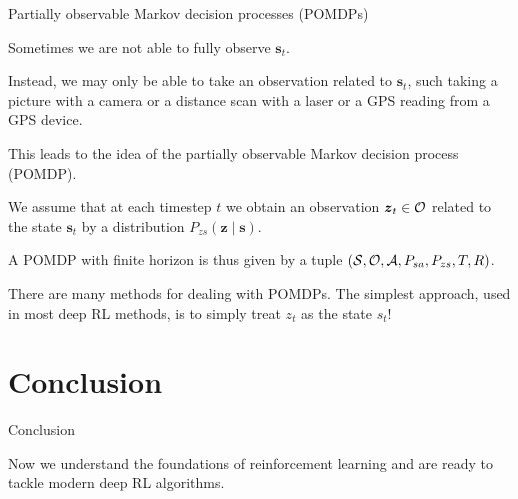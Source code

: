 \documentclass{beamer}
\renewcommand{\vec}[1]{\boldsymbol{#1}}
\begin{document}
\begin{frame}{Partially observable Markov decision processes (POMDPs)}

  Sometimes we are not able to fully observe $\vec{s}_t$.

  \medskip

  Instead, we may only be able to take an \alert{observation} related
  to $\vec{s}_t$, such taking a picture with a camera or a distance
  scan with a laser or a GPS reading from a GPS device.

  \medskip

  This leads to the idea of the \alert{partially observable Markov
    decision process (POMDP)}.

  \medskip

  We assume that at each timestep $t$ we obtain an observation
  $\vec{z}_t \in {\cal O}$ related to the state $\vec{s}_t$ by a distribution
  $P_{zs}(\vec{z} \mid \vec{s})$.

  \medskip

  A POMDP with finite horizon is thus given by a tuple $({\cal S},{\cal O},{\cal
    A},P_{sa},P_{zs},T,R)$.

  \medskip

  There are many methods for dealing with POMDPs. The simplest
  approach, used in most deep RL methods, is to
  \alert{simply treat $z_t$ as the state $s_t$}!

\end{frame}

\section{Conclusion}

\begin{frame}{Conclusion}

  Now we understand the foundations of reinforcement learning and are
  ready to tackle modern deep RL algorithms.

\end{frame}
\end{document}
